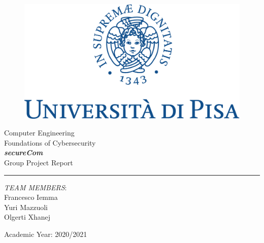 \documentclass[11pt]{report}
\begin{document}
\begin{titlepage}
	\begin{center}
		\begin{figure}
			\includegraphics[width=\textwidth]{img/marchio_unipi_pant541-eps-converted-to.pdf}         
		\end{figure}
		{\Large
			Computer Engineering\\
			\vspace{5mm} %
			Foundations of Cybersecurity}\\
		\vspace{30mm} %
		{\Huge\textbf{\textit{secureCom}}}\\
		\vspace{10mm} %
		{\Large Group Project Report}\\
		\par\noindent\rule{\textwidth}{0.4pt}
		\begin{flushright}
			\textit{TEAM MEMBERS}:\\ 
			Francesco Iemma\\
			Yuri Mazzuoli\\ 
			Olgerti Xhanej\\
			
		\end{flushright}
		\vfill
		Academic Year: 2020/2021\\        
	\end{center}
\end{titlepage} 
\tableofcontents
\end{document}
